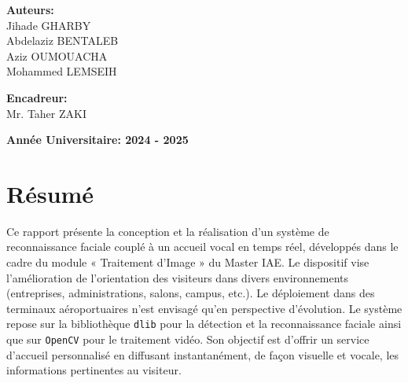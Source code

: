 \documentclass[12pt,a4paper]{article}
\begin{document}
\begin{titlepage}
    \begin{minipage}{0.45\textwidth}
        \centering
        \textbf{\color{primaryblue} Auteurs:}\\
        \vspace{0.3cm}
        {\large Jihade GHARBY}\\
        \vspace{0.2cm}
        {\large Abdelaziz BENTALEB }\\
        \vspace{0.2cm}
        {\large Aziz OUMOUACHA }\\
        \vspace{0.2cm}
        {\large Mohammed LEMSEIH}
    \end{minipage}
    \hfill
    \begin{minipage}{0.45\textwidth}
        \centering
        \textbf{\color{primaryblue} Encadreur:}\\
        \vspace{0.3cm}
        {\large Mr. Taher ZAKI}
    \end{minipage}
    
    \vfill
    
    \begin{tcolorbox}[colback=accentgreen!10, colframe=accentgreen, width=0.6\textwidth, arc=3mm]
        \centering
        {\large\bfseries\color{accentgreen} Année Universitaire: 2024 - 2025}
    \end{tcolorbox}
    
\end{titlepage}

\newpage

\section*{Résumé}

Ce rapport présente la conception et la réalisation d’un système de reconnaissance faciale couplé à un accueil vocal en temps réel, développés dans le cadre du module « Traitement d’Image » du Master IAE. Le dispositif vise l’amélioration de l’orientation des visiteurs dans divers environnements (entreprises, administrations, salons, campus, etc.). Le déploiement dans des terminaux aéroportuaires n’est envisagé qu’en perspective d’évolution. Le système repose sur la bibliothèque \texttt{dlib} pour la détection et la reconnaissance faciale ainsi que sur \texttt{OpenCV} pour le traitement vidéo. Son objectif est d’offrir un service d’accueil personnalisé en diffusant instantanément, de façon visuelle et vocale, les informations pertinentes au visiteur.
\end{document}

